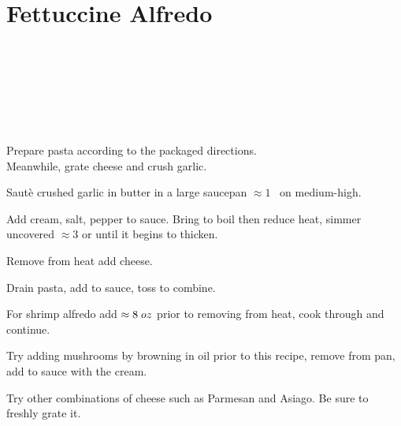 \section{Fettuccine Alfredo}


\begin{recipestats}[
	servings=2 people,
	preptime=10 \minute,
	bakingtime=20 \minute,
	source=\citetitle{newCookBook2014} \cite{newCookBook2014},
	]
\end{recipestats}


\begin{ingredientcolumns}
	\begin{ingredientblock}
		\\
		\\
		\\
	\end{ingredientblock}
	\begin{ingredientblock}
		\ingredient[\onehalf][\teaspoon]{salt}\\
		\ingredient[\oneeighth][\teaspoon]{pepper}\\
		\ingredient[2][\ounce]{Parmesan}
	\end{ingredientblock}
\end{ingredientcolumns}


\begin{preparation}
\item Prepare pasta according to the packaged directions.\\
	Meanwhile, grate cheese and crush garlic.

\item Saut\`{e} crushed garlic in butter in a large saucepan $\approx1$ \minute~on medium-high.

\item Add cream, salt, pepper to sauce. Bring to boil then reduce heat, simmer uncovered $\approx3$ \minute or until it begins to thicken.

\item Remove from heat add cheese.

\item Drain pasta, add to sauce, toss to combine.
\end{preparation}


\begin{variation}
\item For shrimp alfredo add $\approx8\; oz$ prior to removing from heat, cook through and continue.
\item Try adding mushrooms by browning in oil prior to this recipe, remove from pan, add to sauce with the cream.
\item Try other combinations of cheese such as Parmesan and Asiago. Be sure to freshly grate it.
\end{variation}


\recipeend
